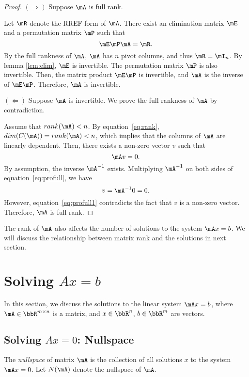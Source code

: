 \documentclass[11pt]{article}
\theoremstyle{plain}
\theoremstyle{definition}
\begin{document}
\begin{proof}
	$(\Rightarrow)$ Suppose $\mA$ is full rank. 
	
	Let $\mR$ denote the RREF form of $\mA$. There exist an elimination matrix $\mE$ and a permutation matrix $\mP$ such that
	\[ \mE \mP \mA =  \mR. \]
	By the full rankness of $\mA$,  $\mA$ has $n$ pivot columns, and thus $\mR = \mI_n$. By lemma \ref{lem:elim}, $\mE$ is invertible. The permutation matrix $\mP$ is also invertible. Then, the matrix product $\mE \mP$ is invertible, and $\mA$ is the inverse of $\mE \mP$. Therefore, $\mA$ is invertible.
	
	$(\Leftarrow)$ Suppose $\mA$ is invertible.  We prove the full rankness of $\mA$ by contradiction. 
	
  Assume that $rank(\mA) < n$. By equation~\eqref{eq:rank}, $dim(C(\mA)) = rank(\mA)<n$, which implies that the columns of $\mA$ are linearly dependent. Then, there exists a non-zero vector $v$ such that 
  \begin{equation}\label{eq:profull}
  	\mA v = 0.
  \end{equation}
By assumption, the inverse $\mA^{-1}$ exists. Multiplying $\mA^{-1}$ on both sides of equation~\eqref{eq:profull}, we have 
 \begin{equation}\label{eq:profull1}
  	v = \mA^{-1} 0 = 0.
  \end{equation}
However, equation~\eqref{eq:profull1} contradicts the fact that $v$ is a non-zero vector. Therefore, $\mA$ is full rank.
\end{proof}

The rank of $\mA$ also affects the number of solutions to the system $\mA x = b$. We will discuss the relationship between matrix rank and the solutions in next section.

\section{Solving $Ax = b$}

In this section, we discuss the solutions to the linear system $\mA x = b$, where $\mA \in \bbR^{m \times n}$ is a matrix, and $x \in \bbR^n$, $b \in \bbR^m$ are vectors.

\subsection{Solving $Ax = 0$: Nullspace}
The \textit{nullspace} of matrix $\mA$ is the collection of all solutions $x$ to the system $\mA x = 0$. Let $N(\mA)$ denote the nullspace of $\mA$.
\end{document}
